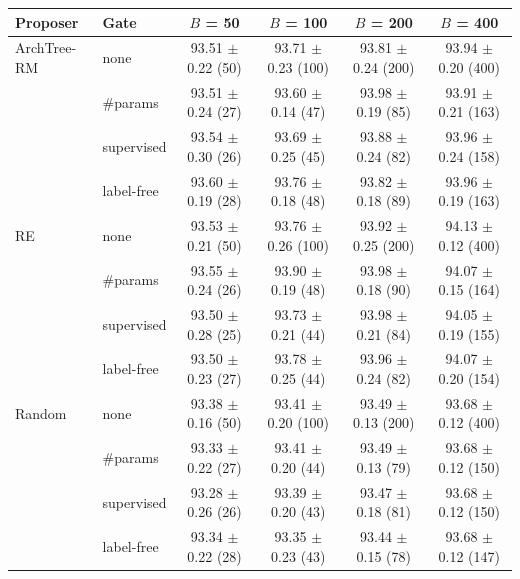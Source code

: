 \begin{tabular}{@{}llcccc@{}}
\toprule
Proposer & Gate & $B$ = 50 & $B$ = 100 & $B$ = 200 & $B$ = 400\\
\midrule
ArchTree-RM & none & 93.51 $\pm$ 0.22 (50) & 93.71 $\pm$ 0.23 (100) & 93.81 $\pm$ 0.24 (200) & 93.94 $\pm$ 0.20 (400)\\
 & \#params & 93.51 $\pm$ 0.24 (27) & 93.60 $\pm$ 0.14 (47) & 93.98 $\pm$ 0.19 (85) & 93.91 $\pm$ 0.21 (163)\\
 & supervised & 93.54 $\pm$ 0.30 (26) & 93.69 $\pm$ 0.25 (45) & 93.88 $\pm$ 0.24 (82) & 93.96 $\pm$ 0.24 (158)\\
 & label-free & 93.60 $\pm$ 0.19 (28) & 93.76 $\pm$ 0.18 (48) & 93.82 $\pm$ 0.18 (89) & 93.96 $\pm$ 0.19 (163)\\
\midrule
RE & none & 93.53 $\pm$ 0.21 (50) & 93.76 $\pm$ 0.26 (100) & 93.92 $\pm$ 0.25 (200) & 94.13 $\pm$ 0.12 (400)\\
 & \#params & 93.55 $\pm$ 0.24 (26) & 93.90 $\pm$ 0.19 (48) & 93.98 $\pm$ 0.18 (90) & 94.07 $\pm$ 0.15 (164)\\
 & supervised & 93.50 $\pm$ 0.28 (25) & 93.73 $\pm$ 0.21 (44) & 93.98 $\pm$ 0.21 (84) & 94.05 $\pm$ 0.19 (155)\\
 & label-free & 93.50 $\pm$ 0.23 (27) & 93.78 $\pm$ 0.25 (44) & 93.96 $\pm$ 0.24 (82) & 94.07 $\pm$ 0.20 (154)\\
\midrule
Random & none & 93.38 $\pm$ 0.16 (50) & 93.41 $\pm$ 0.20 (100) & 93.49 $\pm$ 0.13 (200) & 93.68 $\pm$ 0.12 (400)\\
 & \#params & 93.33 $\pm$ 0.22 (27) & 93.41 $\pm$ 0.20 (44) & 93.49 $\pm$ 0.13 (79) & 93.68 $\pm$ 0.12 (150)\\
 & supervised & 93.28 $\pm$ 0.26 (26) & 93.39 $\pm$ 0.20 (43) & 93.47 $\pm$ 0.18 (81) & 93.68 $\pm$ 0.12 (150)\\
 & label-free & 93.34 $\pm$ 0.22 (28) & 93.35 $\pm$ 0.23 (43) & 93.44 $\pm$ 0.15 (78) & 93.68 $\pm$ 0.12 (147)\\
\bottomrule
\end{tabular}
